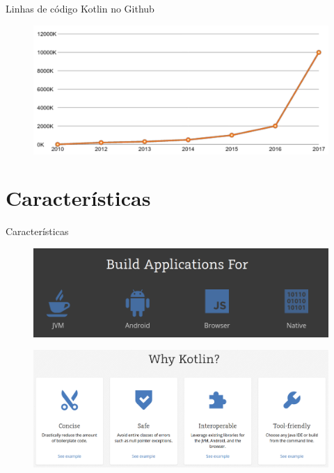 \documentclass{beamer}
\begin{document}
\begin{frame}{Linhas de código Kotlin no Github}
	\begin{figure}[!htb]
		\centering
		\includegraphics[scale=.2]{grafico.png}
	\end{figure}
\end{frame}

\section{Características}
\begin{frame}{Características}
	\begin{figure}[!htb]
		\centering
		\includegraphics[scale=.25]{caracteristicas.png}
	\end{figure}
	
	\begin{figure}[!htb]
		\centering
		\includegraphics[scale=.20]{why.png}
	\end{figure}
	
\end{frame}
\end{document}

